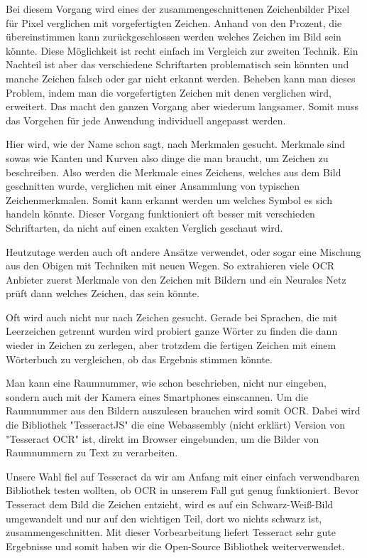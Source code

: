Bei diesem Vorgang wird eines der zusammengeschnittenen Zeichenbilder Pixel für Pixel verglichen mit vorgefertigten Zeichen. Anhand von den Prozent, die übereinstimmen kann zurückgeschlossen werden welches Zeichen im Bild sein könnte. Diese Möglichkeit ist recht einfach im Vergleich zur zweiten Technik. Ein Nachteil ist aber das verschiedene Schriftarten problematisch sein könnten und manche Zeichen falsch oder gar nicht erkannt werden. Beheben kann man dieses Problem, indem man die vorgefertigten Zeichen mit denen verglichen wird, erweitert. Das macht den ganzen Vorgang aber wiederum langsamer. Somit muss das Vorgehen für jede Anwendung individuell angepasst werden.


Hier wird, wie der Name schon sagt, nach Merkmalen gesucht. Merkmale sind sowas wie Kanten und Kurven also dinge die man braucht, um Zeichen zu beschreiben. Also werden die Merkmale eines Zeichens, welches aus dem Bild geschnitten wurde, verglichen mit einer Ansammlung von typischen Zeichenmerkmalen. Somit kann erkannt werden um welches Symbol es sich handeln könnte. Dieser Vorgang funktioniert oft besser mit verschieden Schriftarten, da nicht auf einen exakten Verglich geschaut wird.

Heutzutage werden auch oft andere Ansätze verwendet, oder sogar eine Mischung aus den Obigen mit Techniken mit neuen Wegen. So extrahieren viele OCR Anbieter zuerst Merkmale von den Zeichen mit Bildern und ein Neurales Netz prüft dann welches Zeichen, das sein könnte.

Oft wird auch nicht nur nach Zeichen gesucht. Gerade bei Sprachen, die mit Leerzeichen getrennt wurden wird probiert ganze Wörter zu finden die dann wieder in Zeichen zu zerlegen, aber trotzdem die fertigen Zeichen mit einem Wörterbuch zu vergleichen, ob das Ergebnis stimmen könnte.



Man kann eine Raumnummer, wie schon beschrieben, nicht nur eingeben, sondern auch mit der Kamera eines Smartphones einscannen. Um die Raumnummer aus den Bildern auszulesen brauchen wird somit OCR. Dabei wird die Bibliothek "TesseractJS" die eine Webassembly (nicht erklärt) Version von "Tesseract OCR" ist, direkt im Browser eingebunden, um die Bilder von Raumnummern zu Text zu verarbeiten.

Unsere Wahl fiel auf Tesseract da wir am Anfang mit einer einfach verwendbaren Bibliothek testen wollten, ob OCR in unserem Fall gut genug funktioniert. Bevor Tesseract dem Bild die Zeichen entzieht, wird es auf ein Schwarz-Weiß-Bild umgewandelt und nur auf den wichtigen Teil, dort wo nichts schwarz ist, zusammengeschnitten. Mit dieser Vorbearbeitung liefert Tesseract sehr gute Ergebnisse und somit haben wir die Open-Source Bibliothek weiterverwendet.

